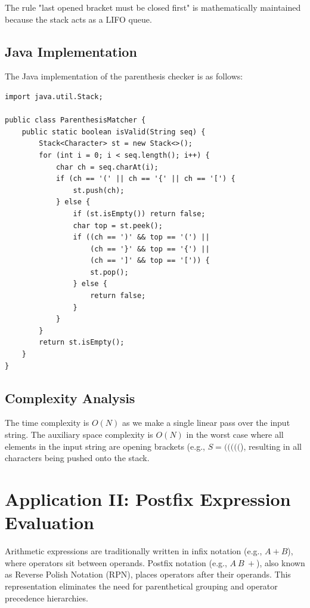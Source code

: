 \documentclass[10pt,journal,compsoc,onecolumn]{IEEEtran}
\begin{document}
The rule "last opened bracket must be closed first" is mathematically maintained because the stack acts as a LIFO queue.

\subsection{Java Implementation}
The Java implementation of the parenthesis checker is as follows:
\begin{verbatim}
import java.util.Stack;

public class ParenthesisMatcher {
    public static boolean isValid(String seq) {
        Stack<Character> st = new Stack<>();
        for (int i = 0; i < seq.length(); i++) {
            char ch = seq.charAt(i);
            if (ch == '(' || ch == '{' || ch == '[') {
                st.push(ch);
            } else {
                if (st.isEmpty()) return false;
                char top = st.peek();
                if ((ch == ')' && top == '(') ||
                    (ch == '}' && top == '{') ||
                    (ch == ']' && top == '[')) {
                    st.pop();
                } else {
                    return false;
                }
            }
        }
        return st.isEmpty();
    }
}
\end{verbatim}

\subsection{Complexity Analysis}
The time complexity is $O(N)$ as we make a single linear pass over the input string. The auxiliary space complexity is $O(N)$ in the worst case where all elements in the input string are opening brackets (e.g., $S = \text{(((((}$), resulting in all characters being pushed onto the stack.

\section{Application II: Postfix Expression Evaluation}
Arithmetic expressions are traditionally written in infix notation (e.g., $A + B$), where operators sit between operands. Postfix notation (e.g., $A\ B\ +$), also known as Reverse Polish Notation (RPN), places operators after their operands. This representation eliminates the need for parenthetical grouping and operator precedence hierarchies.
\end{document}
